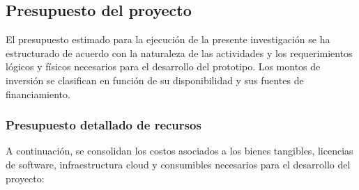 \documentclass[12pt,a4paper]{article}
\begin{document}
\subsection{Presupuesto del proyecto}

El presupuesto estimado para la ejecución de la presente investigación se ha estructurado de acuerdo con la naturaleza de las actividades y los requerimientos lógicos y físicos necesarios para el desarrollo del prototipo. Los montos de inversión se clasifican en función de su disponibilidad y sus fuentes de financiamiento.

\subsubsection{Presupuesto detallado de recursos}

A continuación, se consolidan los costos asociados a los bienes tangibles, licencias de software, infraestructura cloud y consumibles necesarios para el desarrollo del proyecto:
\end{document}
